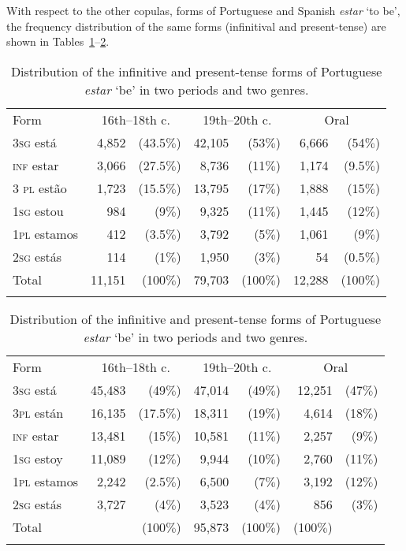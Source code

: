 \documentclass[output=paper,colorlinks,citecolor=brown]{langscibook}
\begin{document}
With respect to the other copulas, forms of Portuguese and Spanish \textit{estar} `to be', the frequency distribution of the same forms (infinitival and present-tense) are shown in Tables~\ref{tab:clements:7}--\ref{tab:clements:8}.


\begin{table}
\begin{tabular}{lrrrrrr}
\lsptoprule
{Form}& \multicolumn{2}{c}{{16th–18th c.}} & \multicolumn{2}{c}{{19th–20th c.}} & \multicolumn{2}{c}{{Oral}}  \\
\cmidrule(lr){1-1}\cmidrule(lr){2-3}\cmidrule(lr){4-5}\cmidrule(lr){6-7}
3\textsc{sg} está & 4,852 & (43.5$\%$) & 42,105 & (53$\%$) & 6,666 & (54$\%$)\\
\textsc{inf }estar & 3,066 & (27.5$\%$)& 8,736 & (11$\%$)& 1,174 & (9.5$\%$)\\
3\textsc{ pl} estão & 1,723 & (15.5$\%$) & 13,795 & (17$\%$)& 1,888 & (15$\%$)\\
1\textsc{sg} estou & 984 & (9$\%$)& 9,325 & (11$\%$)& 1,445 & (12$\%$)\\
1\textsc{pl} estamos & 412 & (3.5$\%$)& 3,792 & (5$\%$)& 1,061 & (9$\%$)\\
2\textsc{sg} estás & 114 & (1$\%$)& 1,950 & (3$\%$) & 54 & (0.5$\%$)\\
\midrule
{Total} &  11,151 & (100$\%$) & 79,703 & (100$\%$) & 12,288 & (100$\%$)\\
\lspbottomrule
\end{tabular}
\caption{Distribution of the infinitive and present-tense forms of Portuguese \textit{estar} `be' in two periods and two genres.}
\label{tab:clements:7}
\end{table}

\begin{table}
\begin{tabular}{lrrrrrr}
\lsptoprule
{Form}& \multicolumn{2}{c}{{16th--18th c.}} & \multicolumn{2}{c}{{19th--20th c.}} & \multicolumn{2}{c}{{Oral}}\\
\cmidrule(lr){1-1}\cmidrule(lr){2-3}\cmidrule(lr){4-5}\cmidrule(lr){6-7}
3\textsc{sg} está & 45,483 & (49$\%$) & 47,014 & (49$\%$) & 12,251 & (47$\%$)\\
3\textsc{pl} están & 16,135 & (17.5$\%$) &  18,311 & (19$\%$) & 4,614 & (18$\%$)\\
\textsc{inf} estar & 13,481 & (15$\%$) & 10,581 & (11$\%$) & 2,257 & (9$\%$)\\
1\textsc{sg} estoy & 11,089  & (12$\%$) & 9,944 & (10$\%$)& 2,760 & (11$\%$)\\
1\textsc{pl} estamos & 2,242 & (2.5$\%$) & 6,500 & (7$\%$)& 3,192 & (12$\%$)\\
2\textsc{sg} estás & 3,727 & (4$\%$)& 3,523 & (4$\%$) & 856 & (3$\%$)\\
\midrule
{Total} &  & (100$\%$)& 95,873 & (100$\%$)&(100$\%$)\\
\lspbottomrule
\end{tabular}
\caption{Distribution of the infinitive and present-tense forms of Portuguese \textit{estar} `be' in two periods and two genres.}
\label{tab:clements:8}
\end{table}
\end{document}
